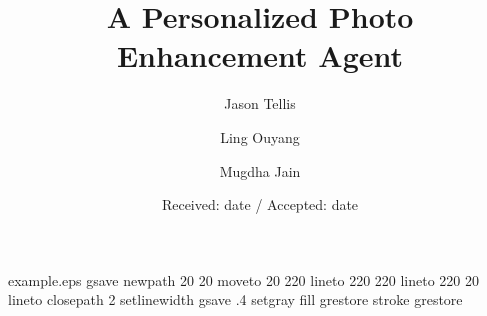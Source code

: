 \begin{filecontents*}{example.eps}
gsave
newpath
  20 20 moveto
  20 220 lineto
  220 220 lineto
  220 20 lineto
closepath
2 setlinewidth
gsave
  .4 setgray fill
grestore
stroke
grestore
\end{filecontents*}
%
\RequirePackage{fix-cm}
\documentclass[smallextended,twocolumn]{svjour3}
%
\smartqed  %
%
\usepackage{graphicx}
\usepackage{float}
\usepackage{amsmath}
\usepackage{mathtools}

\title{A Personalized Photo Enhancement Agent}

\author{Jason Tellis         \and
        Ling Ouyang	\and Mugdha Jain %
}


\date{Received: date / Accepted: date}

\maketitle

\begin{abstract}
An intelligent agent incorporating user's personal preference and feedback was developed for personalized photo enhancement. Most image enhancement techniques rely on heuristic algorithms with some static or probabilistic parameters. This agent learns the user's latent aesthetic preferences from their past images. Using this knowledge, it enhances and customizes new images to match the user's taste. 
The model was trained on user-clicked pictures and user provided labels such as 'liked' and 'disliked'. The agent learns from the training dataset and applies this to improve the user's new photos such that the image quality and style is tailored to the user's personal taste.
To evaluate the performance, users were given a blind test to decide which they liked more between the original and the enhanced photo. 
The images mostly focus on having a human subject.


\end{abstract}

